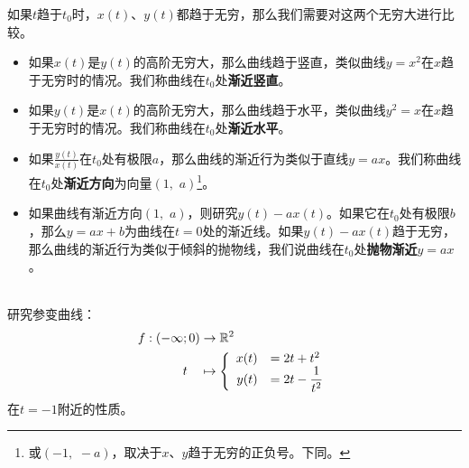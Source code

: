 \documentclass[12pt,UTF8]{ctexbook}
\begin{document}
如果$t$趋于$t_0$时，$x(t)$、$y(t)$都趋于无穷，那么我们需要对这两个无穷大进行比较。
\begin{itemize}
    \item 如果$x(t)$是$y(t)$的高阶无穷大，那么曲线趋于竖直，类似曲线$y = x^2$在$x$趋于无穷时的情况。我们称曲线在$t_0$处\textbf{渐近竖直}。
    \item 如果$y(t)$是$x(t)$的高阶无穷大，那么曲线趋于水平，类似曲线$y^2 = x$在$x$趋于无穷时的情况。我们称曲线在$t_0$处\textbf{渐近水平}。
    \item 如果$\frac{y(t)}{x(t)}$在$t_0$处有极限$a$，那么曲线的渐近行为类似于直线$y = ax$。我们称曲线在$t_0$处\textbf{渐近方向}为向量$(1,\,\,a)$\footnote{或$(-1,\,\,-a)$，取决于$x$、$y$趋于无穷的正负号。下同。}。
    \item 如果曲线有渐近方向$(1, \,\,a)$，则研究$y(t) - ax(t)$。如果它在$t_0$处有极限$b$，那么$y = ax + b$为曲线在$t=0$处的渐近线。如果$y(t) - ax(t)$趋于无穷，那么曲线的渐近行为类似于倾斜的抛物线，我们说曲线在$t_0$处\textbf{抛物渐近}$y = ax$。
\end{itemize}

\begin{et}
    \mbox{} \\
    研究参变曲线：%
    \begin{align*}
        f: (-\infty;0) &\rightarrow \mathbb{R}^2 \\
        t\quad &\mapsto\left\{
            \begin{array}[]{rl}
                x(t) &=2t + t^2 \\
                y(t) &\displaystyle = 2t - \frac{1}{t^2}\\
            \end{array}
        \right.
    \end{align*}
    在$t=-1$附近的性质。
\end{et}
\end{document}
